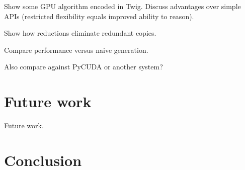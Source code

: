 \documentclass[11pt]{article}
\begin{document}
Show some GPU algorithm encoded in Twig. Discuss advantages over simple APIs
(restricted flexibility equals improved ability to reason).

Show how reductions eliminate redundant copies.

Compare performance versus naive generation.

Also compare against PyCUDA or another system?

\section{Future work}

Future work.

\section{Conclusion}


% 

% 
% 
\end{document}
